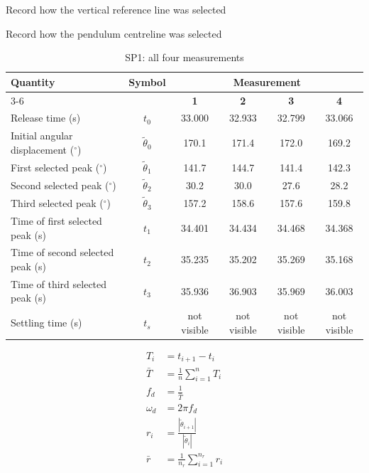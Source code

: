 \documentclass[11pt,a4paper]{article}
\begin{document}
Record how the vertical reference line was selected\newline

Record how the pendulum centreline was selected\newline

\begin{table}[H]
    \centering
    \caption{SP1: all four measurements}
    \label{tab:sp1_all}
    \renewcommand{\arraystretch}{1.6}
    \begin{tabular}{|l|c|c|c|c|c|}
        \hline
        \textbf{Quantity} & \textbf{Symbol} & \multicolumn{4}{c|}{\textbf{Measurement}} \\
        \cline{3-6}
         & & \textbf{1} & \textbf{2} & \textbf{3} & \textbf{4} \\
        \hline
        Release time (s)                        & $t_0$              & 33.000 & 32.933 & 32.799 & 33.066 \\ \hline
        Initial angular displacement ($^\circ$) & $\tilde{\theta}_0$ & 170.1  & 171.4  & 172.0  & 169.2  \\ \hline
        First selected peak ($^\circ$)          & $\tilde{\theta}_1$ & 141.7  & 144.7  & 141.4  & 142.3  \\ \hline
        Second selected peak ($^\circ$)         & $\tilde{\theta}_2$ & 30.2   & 30.0   & 27.6   & 28.2   \\ \hline
        Third selected peak ($^\circ$)          & $\tilde{\theta}_3$ & 157.2  & 158.6  & 157.6  & 159.8  \\ \hline
        Time of first selected peak (s)         & $t_1$              & 34.401 & 34.434 & 34.468 & 34.368 \\ \hline
        Time of second selected peak (s)        & $t_2$              & 35.235 & 35.202 & 35.269 & 35.168 \\ \hline
        Time of third selected peak (s)         & $t_3$              & 35.936 & 36.903 & 35.969 & 36.003 \\ \hline
        Settling time (s)                       & $t_s$              & not visible & not visible & not visible  &    not visible    \\ \hline
    \end{tabular}
\end{table}

\begin{align}
T_i &= t_{i+1} - t_i \label{eq:Ti} \\
\bar{T} &= \frac{1}{n}\sum_{i=1}^{n} T_i \label{eq:Tmean} \\
f_d &= \frac{1}{\bar{T}} \label{eq:fd} \\
\omega_d &= 2\pi f_d \label{eq:wd} \\
r_i &= \frac{|\tilde{\theta}_{i+1}|}{|\tilde{\theta}_i|} \label{eq:ri} \\
\bar{r} &= \frac{1}{n_r}\sum_{i=1}^{n_r} r_i \label{eq:rmean}
\end{align}
\end{document}
